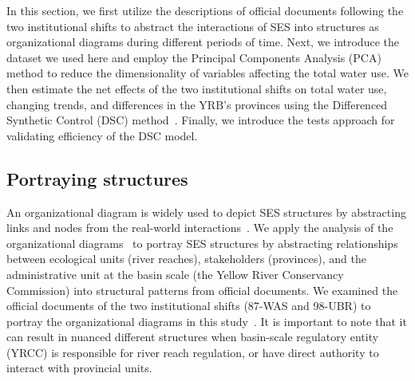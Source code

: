 
In this section, we first utilize the descriptions of official documents following the two institutional shifts to abstract the interactions of SES into structures as organizational diagrams during different periods of time.
Next, we introduce the dataset we used here and employ the Principal Components Analysis (PCA) method to reduce the dimensionality of variables affecting the total water use.
We then estimate the net effects of the two institutional shifts on total water use, changing trends, and differences in the YRB's provinces using the Differenced Synthetic Control (DSC) method~\cite{arkhangelsky2021}.
Finally, we introduce the tests approach for validating efficiency of the DSC model.

\subsection{Portraying structures}\label{sec:structures}

An organizational diagram is widely used to depict SES structures by abstracting links and nodes from the real-world interactions~\cite{wang2022g,bodin2017a,kluger2020,guerrero2015}.
We apply the analysis of the organizational diagrams~\cite{bodin2017b} to portray SES structures by abstracting relationships between ecological units (river reaches), stakeholders (provinces), and the administrative unit at the basin scale (the Yellow River Conservancy Commission) into structural patterns from official documents.
We examined the official documents of the two institutional shifts (87-WAS and 98-UBR) to portray the organizational diagrams in this study~\cite{bodin2017a,kluger2020,guerrero2015}.
It is important to note that it can result in nuanced different structures when basin-scale regulatory entity (YRCC) is responsible for river reach regulation, or have direct authority to interact with provincial units.

